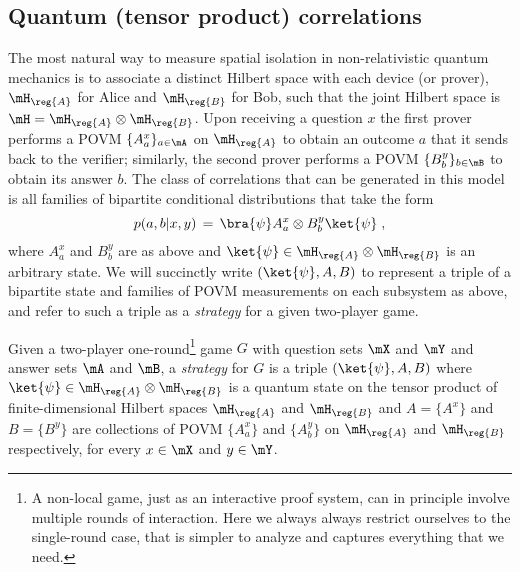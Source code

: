 \subsection{Quantum (tensor product) correlations}

The most natural way to measure spatial isolation in non-relativistic quantum mechanics is to associate a distinct Hilbert space with each device (or prover), $\mH_\reg{A}$ for Alice and $\mH_{\reg{B}}$ for Bob, such that the joint Hilbert space is $\mH = \mH_\reg{A} \otimes \mH_\reg{B}$. Upon receiving a question $x$ the first prover performs a POVM $\{A^x_a\}_{a\in\mA}$ on $\mH_\reg{A}$ to obtain an outcome $a$ that it sends back to the verifier; similarly, the second prover performs a POVM $\{B^y_b\}_{b\in\mB}$ to obtain its answer $b$. The class of correlations that can be generated in this model is all families of bipartite conditional distributions that take the form
\begin{equation}\label{eq:tensor-model} 
p(a,b|x,y)\,=\, \bra{\psi} A^x_a \otimes B^y_b \ket{\psi}\;,
\end{equation}
where $A^x_a$ and $B^y_b$ are as above and $\ket{\psi} \in \mH_\reg{A} \otimes \mH_\reg{B}$ is an arbitrary state. We will succinctly write $(\ket{\psi},A,B)$ to represent a triple of a bipartite state and families of POVM measurements on each subsystem as above, and refer to such a triple as a \emph{strategy} for a given two-player game. 

\begin{definition}
Given a two-player one-round\footnote{A non-local game, just as an interactive proof system, can in principle involve multiple rounds of interaction. Here we always always restrict ourselves to the single-round case, that is simpler to analyze and captures everything that we need.} game $G$ with question sets $\mX$ and $\mY$ and answer sets $\mA$ and $\mB$, a \emph{strategy} for $G$ is a triple $(\ket{\psi},A,B)$ where $\ket{\psi} \in \mH_\reg{A} \otimes \mH_\reg{B}$ is a quantum state on the tensor product of finite-dimensional Hilbert spaces $\mH_\reg{A}$ and $\mH_{\reg{B}}$ and $A = \{A^x\}$ and $B=\{B^y\}$ are collections of POVM $\{A^x_a\}$ and $\{A^y_b\}$ on $\mH_\reg{A}$ and $\mH_\reg{B}$ respectively, for every $x\in \mX$ and $y\in \mY$. 
\end{definition}

